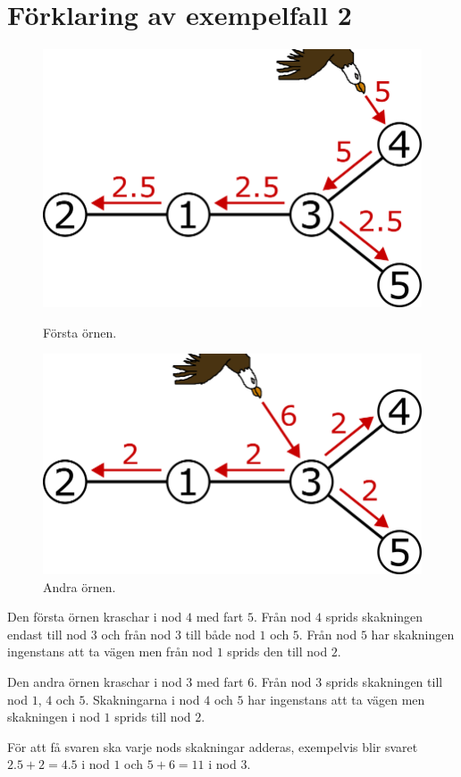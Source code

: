 \section*{Förklaring av exempelfall 2}
\begin{figure}
  \centering
  \begin{minipage}{.5\textwidth}
    \centering
    \includegraphics[width=0.8\linewidth]{a}
    \caption{Första örnen.}
    \label{fig:test1}
  \end{minipage}%
  \begin{minipage}{.5\textwidth}
    \centering
    \includegraphics[width=0.8\linewidth]{b}
    \caption{Andra örnen.}
    \label{fig:test2}
  \end{minipage}
\end{figure}
      
      
Den första örnen kraschar i nod $4$ med fart $5$.
Från nod $4$ sprids skakningen endast till nod $3$ och från nod $3$ till både nod $1$ och $5$.
Från nod $5$ har skakningen ingenstans att ta vägen men från nod $1$ sprids den till nod $2$.

Den andra örnen kraschar i nod $3$ med fart $6$.
Från nod $3$ sprids skakningen till nod $1$, $4$ och $5$.
Skakningarna i nod $4$ och $5$ har ingenstans att ta vägen men skakningen i nod $1$ sprids till nod $2$.

För att få svaren ska varje nods skakningar adderas, exempelvis blir svaret $2.5+2=4.5$ i nod $1$ och $5+6=11$ i nod $3$.
